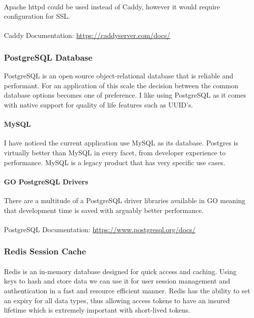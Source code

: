 \paragraph{}
Apache httpd could be used instead of Caddy, however it would require configuration for SSL.

\paragraph{} Caddy Documentation: \url{https://caddyserver.com/docs/}

\subsubsection{PostgreSQL Database}
PostgreSQL is an open source object-relational database that is reliable and performant.
For an application of this scale the decision between the common database options becomes one of preference.
I like using PostgreSQL as it comes with native support for quality of life features such as UUID's.

\paragraph{MySQL}
I have noticed the current application use MySQL as its database.
Postgres is virtually better than MySQL in every facet, from developer experience to performance.
MySQL is a legacy product that has very specific use cases.

\paragraph{GO PostgreSQL Drivers}
There are a multitude of a PostgreSQL driver libraries available in GO meaning that development time is saved with arguably
better performance.

\paragraph{} PostgreSQL Documentation: \url{https://www.postgresql.org/docs/}

\subsubsection{Redis Session Cache}
\paragraph{}
Redis is an in-memory database designed for quick access and caching.
Using keys to hash and store data we can use it for user session management and authentication in a fast and resource efficient
manner.
Redis has the ability to set an expiry for all data types, thus allowing access tokens to have an insured lifetime which is
extremely important with short-lived tokens.

